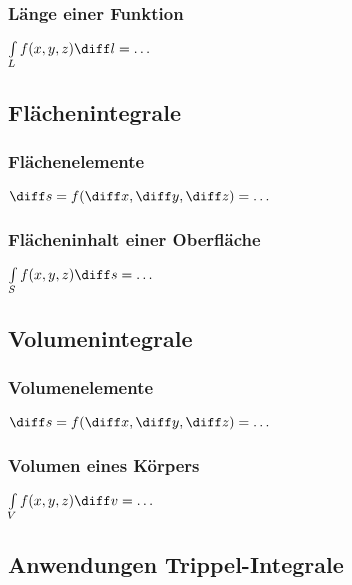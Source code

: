 \subsubsection{Länge einer Funktion}
$ \int\limits_{L} f(x,y,z) \diff l = \dots $

\subsection{Flächenintegrale}
\subsubsection{Flächenelemente}
$ \diff s = f(\diff x, \diff y, \diff z) = \dots $
\subsubsection{Flächeninhalt einer Oberfläche}
$ \int\limits_{S} f(x,y,z) \diff s = \dots $

\subsection{Volumenintegrale}
\subsubsection{Volumenelemente}
$ \diff s = f(\diff x, \diff y, \diff z) = \dots $
\subsubsection{Volumen eines Körpers}
$ \int\limits_{V} f(x,y,z) \diff v = \dots $

\subsection{Anwendungen Trippel-Integrale}
\smallskip
